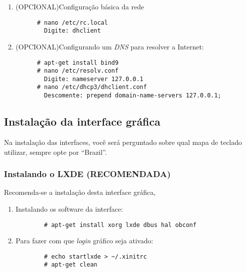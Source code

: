 \documentclass[a4paper,10pt]{article}
\begin{document}
\begin{enumerate}
      \item (OPCIONAL)Configuração básica da rede
	\begin{lstlisting}
	  # nano /etc/rc.local
	    Digite: dhclient
	\end{lstlisting}

      \item (OPCIONAL)Configurando um \emph{DNS} para resolver a Internet:
	\begin{lstlisting}
	  # apt-get install bind9
	  # nano /etc/resolv.conf 
	    Digite: nameserver 127.0.0.1
	  # nano /etc/dhcp3/dhclient.conf
	    Descomente: prepend domain-name-servers 127.0.0.1;
	\end{lstlisting}
    \end{enumerate}

  \subsection{Instalação da interface gráfica}
  Na instalação das interfaces, você será perguntado sobre qual mapa de teclado utilizar,
  sempre opte por ``Brazil''.
    \subsubsection{Instalando o LXDE (RECOMENDADA)}
      Recomenda-se a instalação desta interface gráfica,
      \begin{enumerate}
	\item Instalando os software da interface:
	  \begin{verbatim}
	    # apt-get install xorg lxde dbus hal obconf
	  \end{verbatim}
	\item Para fazer com que \emph{login} gráfico seja ativado:
	  \begin{verbatim}
	    # echo startlxde > ~/.xinitrc
	    # apt-get clean
	  \end{verbatim}
      \end{enumerate}
\end{document}
